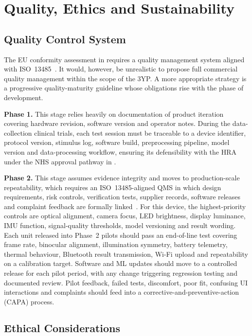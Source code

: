 \section{Quality, Ethics and Sustainability}
\label{sec:ent-ethics}

\subsection{Quality Control System}

The EU conformity assessment in  requires a quality management system aligned with ISO~13485~\cite{iso13485}. It would, however, be unrealistic to propose full commercial quality management within the scope of the 3YP. A more appropriate strategy is a progressive quality-maturity guideline whose obligations rise with the phase of development.

\textbf{Phase 1.} This stage relies heavily on documentation of product iteration covering hardware revision, software version and operator notes. During the data-collection clinical trials, each test session must be traceable to a device identifier, protocol version, stimulus log, software build, preprocessing pipeline, model version and data-processing workflow, ensuring its defensibility with the HRA under the NHS approval pathway in .

\textbf{Phase 2.} This stage assumes evidence integrity and moves to production-scale repeatability, which requires an ISO~13485-aligned QMS in which design requirements, risk controls, verification tests, supplier records, software releases and complaint feedback are formally linked~\cite{iso13485}. For this device, the highest-priority controls are optical alignment, camera focus, LED brightness, display luminance, IMU function, signal-quality thresholds, model versioning and result wording. Each unit released into Phase~2 pilots should pass an end-of-line test covering frame rate, binocular alignment, illumination symmetry, battery telemetry, thermal behaviour, Bluetooth result transmission, Wi-Fi upload and repeatability on a calibration target. Software and ML updates should move to a controlled release for each pilot period, with any change triggering regression testing and documented review. Pilot feedback, failed tests, discomfort, poor fit, confusing UI interactions and complaints should feed into a corrective-and-preventive-action (CAPA) process.

\subsection{Ethical Considerations}

